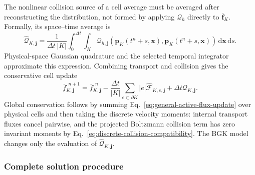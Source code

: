 \documentclass[preprint,3p,12pt]{elsarticle}
\newcommand{\dd}{\,\mathrm{d}}
\newcommand{\vct}[1]{\boldsymbol{#1}}
\newcommand{\avg}[1]{\overline{#1}}
\begin{document}
The nonlinear collision source of a cell average must be averaged after reconstructing the distribution, not formed by applying $\mathcal{Q}_h$ directly to $\avg{\vct{f}}_K$. Formally, its space--time average is
\begin{equation}
  \widehat{\mathcal{Q}}_{K,\vct{j}}
  =\frac{1}{\Delta t\,|K|}
   \int_0^{\Delta t}\int_K
   \mathcal{Q}_{h,\vct{j}}
   (\vct{p}_K(t^n+s,\vct{x}),
    \vct{p}_K(t^n+s,\vct{x}))
   \dd\vct{x}\dd s.
  \label{eq:cell-averaged-collision}
\end{equation}
Physical-space Gaussian quadrature and the selected temporal integrator approximate this expression. Combining transport and collision gives the conservative cell update
\begin{equation}
  \avg{f}_{K,\vct{j}}^{,n+1}
  =\avg{f}_{K,\vct{j}}^{,n}
  -\frac{\Delta t}{|K|}
   \sum_{e\subset\partial K}|e|
   \widehat{\mathcal{F}}_{K,e,\vct{j}}
  +\Delta t\widehat{\mathcal{Q}}_{K,\vct{j}}.
  \label{eq:general-active-flux-update}
\end{equation}
Global conservation follows by summing Eq.~\eqref{eq:general-active-flux-update} over physical cells and then taking the discrete velocity moments: internal transport fluxes cancel pairwise, and the projected Boltzmann collision term has zero invariant moments by Eq.~\eqref{eq:discrete-collision-compatibility}. The BGK model changes only the evaluation of $\widehat{\mathcal{Q}}_{K,\vct{j}}$.

\subsubsection{Complete solution procedure}
\end{document}
